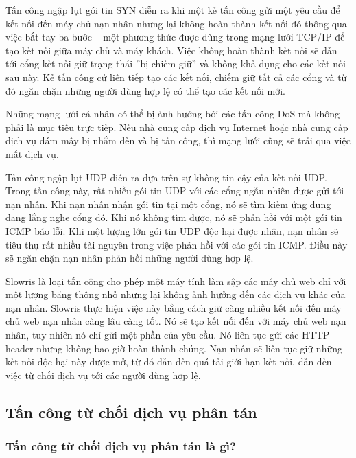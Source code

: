 Tấn công ngập lụt gói tin SYN \cite{1-dos-concept} diễn ra khi một kẻ tấn công gửi một yêu cầu để kết nối đến máy chủ nạn nhân nhưng lại không hoàn thành kết nối đó thông qua việc bắt tay ba bước – một phương thức được dùng trong mạng lưới TCP/IP để tạo kết nối giữa máy chủ và máy khách. Việc không hoàn thành kết nối sẽ dẫn tới cổng kết nối giữ trạng thái ''bị chiếm giữ'' và không khả dụng cho các kết nối sau này. Kẻ tấn công cứ liên tiếp tạo các kết nối, chiếm giữ tất cả các cổng và từ đó ngăn chặn những người dùng hợp lệ có thể tạo các kết nối mới.

Những mạng lưới cá nhân có thể bị ảnh hưởng bởi các tấn công DoS mà không phải là mục tiêu trực tiếp. Nếu nhà cung cấp dịch vụ Internet hoặc nhà cung cấp dịch vụ đám mây bị nhắm đến và bị tấn công, thì mạng lưới cũng sẽ trải qua việc mất dịch vụ.

Tấn công ngập lụt UDP \cite{2-imperva} diễn ra dựa trên sự không tin cậy của kết nối UDP. Trong tấn công này, rất nhiều gói tin UDP với các cổng ngẫu nhiên được gửi tới nạn nhân. Khi nạn nhân nhận gói tin tại một cổng, nó sẽ tìm kiếm ứng dụng đang lắng nghe cổng đó. Khi nó không tìm được, nó sẽ phản hồi với một gói tin ICMP báo lỗi. Khi một lượng lớn gói tin UDP độc hại được nhận, nạn nhân sẽ tiêu thụ rất nhiều tài nguyên trong việc phản hồi với các gói tin ICMP. Điều này sẽ ngăn chặn nạn nhân phản hồi những người dùng hợp lệ.
 
Slowris \cite{2-imperva} là loại tấn công cho phép một máy tính làm sập các máy chủ web chỉ với một lượng băng thông nhỏ nhưng lại không ảnh hưởng đến các dịch vụ khác của nạn nhân. Slowris thực hiện việc này bằng cách giữ càng nhiều kết nối đến máy chủ web nạn nhân càng lâu càng tốt. Nó sẽ tạo kết nối đến với máy chủ web nạn nhân, tuy nhiên nó chỉ gửi một phần của yêu cầu. Nó liên tục gửi các HTTP header nhưng không bao giờ hoàn thành chúng. Nạn nhân sẽ liên tục giữ những kết nối độc hại này được mở, từ đó dẫn đến quá tải giới hạn kết nối, dẫn đến việc từ chối dịch vụ tới các người dùng hợp lệ.

\subsection{Tấn công từ chối dịch vụ phân tán}

\subsubsection{Tấn công từ chối dịch vụ phân tán là gì?}

